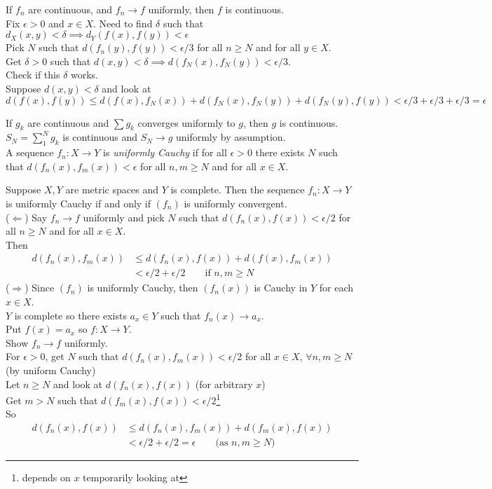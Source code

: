 \thm If $f_n$ are continuous, and $f_n\to f$ uniformly, then $f$ is continuous. \\
\pf Fix $\epsilon>0$ and $x\in X$.  Need to find $\delta$ such that $d_X(x,y)<\delta\implies d_Y(f(x),f(y))<\epsilon$ \\
Pick $N$ such that $d(f_n(y),f(y))<\epsilon/3$ for all $n\geq N$ and for all $y\in X$. \\
Get $\delta>0$ such that $d(x,y)<\delta \implies d(f_N(x),f_N(y))<\epsilon/3$. \\
Check if this $\delta$ works. \\
Suppose $d(x,y)<\delta$ and look at $d(f(x),f(y))\leq d(f(x),f_N(x))+d(f_N(x),f_N(y))+d(f_N(y),f(y))<\epsilon/3+\epsilon/3+\epsilon/3=\epsilon$

\cor If $g_k$ are continuous and $\sum g_k$ converges uniformly to $g$, then $g$ is continuous. \\
\pf $S_N=\sum_1^N g_k$ is continuous and $S_N\to g$ uniformly by assumption. \\
 A sequence $f_n\colon X\to Y$ is \emph{uniformly Cauchy} if for all $\epsilon>0$ there exists $N$ such that $d(f_n(x),f_m(x))<\epsilon$ for all $n,m\geq N$ and for all $x\in X$.

\thm Suppose $X,Y$ are metric spaces and $Y$ is complete.  Then the sequence $f_n\colon X\to Y$ is uniformly Cauchy if and only if $(f_n)$ is uniformly convergent. \\
\pf ($\Longleftarrow$) Say $f_n\to f$ uniformly and pick $N$ such that $d(f_n(x),f(x))<\epsilon/2$ for all $n\geq N$ and for all $x\in X$. \\
Then
\begin{align*}
d(f_n(x),f_m(x)) &\leq d(f_n(x),f(x)) + d(f(x),f_m(x)) \\
&< \epsilon/2 + \epsilon/2 \qquad\text{if $n,m\geq N$}
\end{align*}
($\Longrightarrow$) Since $(f_n)$ is uniformly Cauchy, then $(f_n(x))$ is Cauchy in $Y$ for each $x\in X$. \\
$Y$ is complete so there exists $a_x\in Y$ such that $f_n(x)\to a_x$. \\
Put $f(x)=a_x$ so $f\colon X\to Y$. \\
Show $f_n\to f$ uniformly. \\
For $\epsilon>0$, get $N$ such that $d(f_n(x),f_m(x))<\epsilon/2$ for all $x\in X$, $\forall n,m\geq N$ (by uniform Cauchy) \\
Let $n\geq N$ and look at $d(f_n(x),f(x))$ (for arbitrary $x$) \\
Get $m>N$ such that $d(f_m(x),f(x))<\epsilon/2$\footnote{depends on $x$ temporarily looking at} \\
So
\begin{align*}
d(f_n(x),f(x)) &\leq d(f_n(x),f_m(x)) + d(f_m(x),f(x)) \\
&< \epsilon/2 + \epsilon/2 = \epsilon \qquad\text{(as $n,m\geq N$)}
\end{align*}
